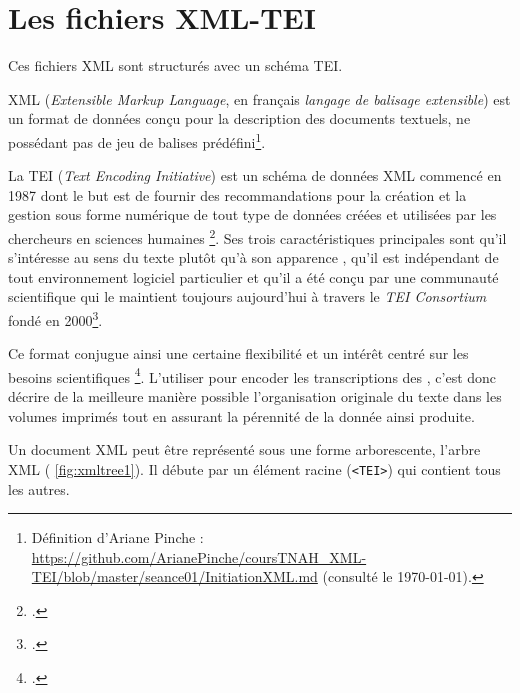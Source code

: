 \section{Les fichiers XML-TEI}

Ces fichiers XML sont structurés avec un schéma TEI.

XML (\textit{Extensible Markup Language}, en français \textit{langage de balisage extensible}) est un format de données conçu pour la description des documents textuels, ne possédant pas de jeu de balises prédéfini\footnote{Définition d'Ariane Pinche : \url{https://github.com/ArianePinche/coursTNAH_XML-TEI/blob/master/seance01/InitiationXML.md} (consulté le \today).}.

La TEI (\textit{Text Encoding Initiative}) est un schéma de données XML commencé en 1987 dont le but est de \og fournir des recommandations pour la création et la gestion sous forme numérique de tout type de données créées et utilisées par les chercheurs en sciences humaines \fg\footcite[p. 9]{burnard}. Ses trois caractéristiques principales sont qu'il \og s’intéresse au sens du texte plutôt qu'à son apparence \fg, qu'il est \og indépendant de tout environnement logiciel particulier \fg{} et qu'il a été conçu par une communauté scientifique qui le maintient toujours aujourd'hui à travers le \textit{TEI Consortium} fondé en 2000\footcite[p. 9]{burnard}. 

Ce format conjugue ainsi une certaine \og flexibilité et un intérêt centré sur les besoins scientifiques \fg\footcite[p. 10]{burnard}. L'utiliser pour encoder les transcriptions des \odm, c'est donc décrire de la meilleure manière possible l'organisation originale du texte dans les volumes imprimés tout en assurant la pérennité de la donnée ainsi produite.

Un document XML peut être représenté sous une forme arborescente, \og l'arbre XML \fg{} (\fig{} \ref{fig:xmltree1}). Il débute par un élément racine (\texttt{<TEI>}) qui contient tous les autres.

